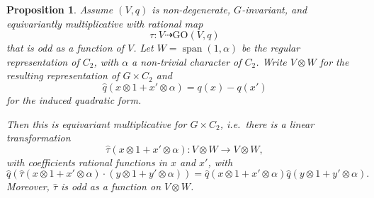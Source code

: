 \documentclass[12pt]{amsart}
\numberwithin{equation}{section}
\newcommand{\wQ}{\widehat{q}}
\newcommand{\wT}{\widehat{\tau}}
\newcommand{\GO}{\mathrm{GO}}
\theoremstyle{plain}
\newtheorem{prop}{Proposition}[section]
\theoremstyle{definition}
\theoremstyle{remark}
\begin{document}
\begin{prop}
Assume $(V,q)$ is non-degenerate, $G$-invariant, and 
equivariantly multiplicative with rational map
$$\tau:V \dashrightarrow \GO(V,q)$$
that is odd as a function of $V$.
Let $W=\operatorname{span}(1,\alpha)$ be the regular representation of $C_2$, with $\alpha$ a non-trivial character of $C_2$. Write
$V\otimes W$ for the resulting representation of $G\times C_2$ and 
$$\wQ(x\otimes 1+x'\otimes \alpha) = q(x) - q(x')$$
for the induced quadratic form.

Then this is equivariant multiplicative for $G\times C_2$, i.e.~there is a linear transformation
$$\wT(x\otimes 1 + x'\otimes \alpha): V\otimes W \rightarrow V\otimes W,$$
with coefficients rational functions in $x$ and $x'$,
with
$$\wQ(\wT(x\otimes 1 + x'\otimes \alpha)\cdot
(y\otimes 1 + y'\otimes \alpha))=
\wQ(x\otimes 1 + x'\otimes \alpha)
\wQ(y\otimes 1 + y'\otimes \alpha).$$
Moreover, $\wT$ is odd as a function on $V\otimes W$.
\end{prop}
\end{document}
